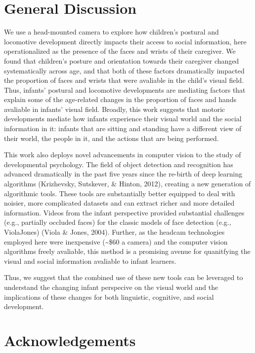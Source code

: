 \documentclass[10pt, letterpaper]{article}
\begin{document}
\section{General Discussion}\label{general-discussion}

We use a head-mounted camera to explore how children's postural and
locomotive development directly impacts their access to social
information, here operationalized as the presence of the faces and
wrists of their caregiver. We found that children's posture and
orientation towards their caregiver changed systematically across age,
and that both of these factors dramatically impacted the proportion of
faces and wrists that were avaliable in the child's visual field. Thus,
infants' postural and locomotive developments are mediating factors that
explain some of the age-related changes in the proportion of faces and
hands avaliable in infants' visual field. Broadly, this work suggests
that motoric developments mediate how infants experience their visual
world and the social information in it: infants that are sitting and
standing have a different view of their world, the people in it, and the
actions that are being performed.

This work also deploys novel advancements in computer vision to the
study of developmental psychology. The field of object detection and
recognition has advanced dramatically in the past five years since the
re-birth of deep learning algorithms (Krizhevsky, Sutskever, \& Hinton,
2012), creating a new generation of algorithmic tools. These tools are
substantially better equipped to deal with noisier, more complicated
datasets and can extract richer and more detailed information. Videos
from the infant perspective provided substantial challenges (e.g.,
partially occluded faces) for the classic models of face detection
(e.g., ViolaJones) (Viola \& Jones, 2004). Further, as the headcam
technologies employed here were inexpensive (\textasciitilde{}\$60 a
camera) and the computer vision algorithms freely avaliable, this method
is a promising avenue for quanitfying the visual and social information
avaliable to infant learners.

Thus, we suggest that the combined use of these new tools can be
leveraged to understand the changing infant perspecive on the visual
world and the implications of these changes for both linguistic,
cognitive, and social development.

\section{Acknowledgements}\label{acknowledgements}
\end{document}
